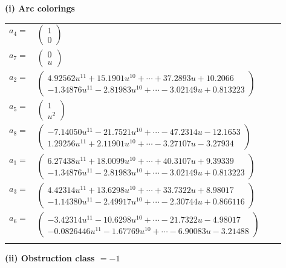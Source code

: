 \documentclass[1p]{elsarticle_modified}
\theoremstyle{definition}
\begin{document}
\flushleft \textbf{(i) Arc colorings}\\
\begin{tabular}{m{7pt} m{180pt} m{7pt} m{180pt} }
\flushright $a_{4}=$&$\begin{pmatrix}1\\0\end{pmatrix}$ \\
\flushright $a_{7}=$&$\begin{pmatrix}0\\u\end{pmatrix}$ \\
\flushright $a_{2}=$&$\begin{pmatrix}4.92562 u^{11}+15.1901 u^{10}+\cdots+37.2893 u+10.2066\\-1.34876 u^{11}-2.81983 u^{10}+\cdots-3.02149 u+0.813223\end{pmatrix}$ \\
\flushright $a_{5}=$&$\begin{pmatrix}1\\u^2\end{pmatrix}$ \\
\flushright $a_{8}=$&$\begin{pmatrix}-7.14050 u^{11}-21.7521 u^{10}+\cdots-47.2314 u-12.1653\\1.29256 u^{11}+2.11901 u^{10}+\cdots-3.27107 u-3.27934\end{pmatrix}$ \\
\flushright $a_{1}=$&$\begin{pmatrix}6.27438 u^{11}+18.0099 u^{10}+\cdots+40.3107 u+9.39339\\-1.34876 u^{11}-2.81983 u^{10}+\cdots-3.02149 u+0.813223\end{pmatrix}$ \\
\flushright $a_{3}=$&$\begin{pmatrix}4.42314 u^{11}+13.6298 u^{10}+\cdots+33.7322 u+8.98017\\-1.14380 u^{11}-2.49917 u^{10}+\cdots-2.30744 u+0.866116\end{pmatrix}$ \\
\flushright $a_{6}=$&$\begin{pmatrix}-3.42314 u^{11}-10.6298 u^{10}+\cdots-21.7322 u-4.98017\\-0.0826446 u^{11}-1.67769 u^{10}+\cdots-6.90083 u-3.21488\end{pmatrix}$\\&\end{tabular}
\flushleft \textbf{(ii) Obstruction class $= -1$}\\~\\
\end{document}
